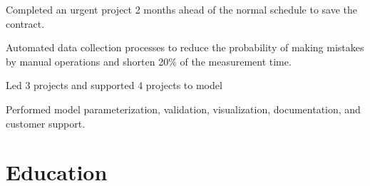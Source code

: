 \documentclass[letterpaper]{deedy-resume-openfont}
\begin{document}
\begin{tightemize}
\item Completed an urgent project 2 months ahead of the normal schedule to save the contract. 
\item Automated data collection processes to reduce the probability of making mistakes by manual operations and shorten 20\% of the measurement time.
\item Led 3 projects and supported 4 projects to model 
\item Performed model parameterization, validation, visualization, documentation, and customer support.

\end{tightemize}
\sectionsep





\section{Education} 
\end{document}
